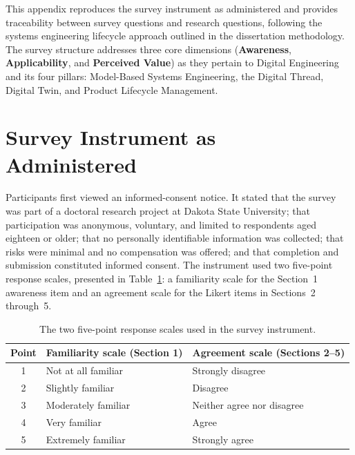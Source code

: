 

  \label{appendix:survey-mapping}

  This appendix reproduces the survey instrument as administered and provides traceability between survey questions and research questions, following the systems engineering lifecycle approach outlined in the dissertation methodology. The survey structure addresses three core dimensions (\textbf{Awareness}, \textbf{Applicability}, and \textbf{Perceived Value}) as they pertain to Digital Engineering and its four pillars: Model-Based Systems Engineering, the Digital Thread, Digital Twin, and Product Lifecycle Management.

  \section{Survey Instrument as Administered}

  Participants first viewed an informed-consent notice. It stated that the survey was part of a doctoral research project at Dakota State University; that participation was anonymous, voluntary, and limited to respondents aged eighteen or older; that no personally identifiable information was collected; that risks were minimal and no compensation was offered; and that completion and submission constituted informed consent. The instrument used two five-point response scales, presented in Table~\ref{tab:scales}: a familiarity scale for the Section~1 awareness item and an agreement scale for the Likert items in Sections~2 through~5.

  \begin{table}[H]
    \centering
    \caption{The two five-point response scales used in the survey instrument.}\label{tab:scales}
    \begin{tabular}{@{}cll@{}}
      \toprule
      \textbf{Point} & \textbf{Familiarity scale (Section 1)} & \textbf{Agreement scale (Sections 2--5)} \\
      \midrule
      1 & Not at all familiar & Strongly disagree \\
      2 & Slightly familiar   & Disagree \\
      3 & Moderately familiar & Neither agree nor disagree \\
      4 & Very familiar       & Agree \\
      5 & Extremely familiar  & Strongly agree \\
      \bottomrule
    \end{tabular}
  \end{table}

